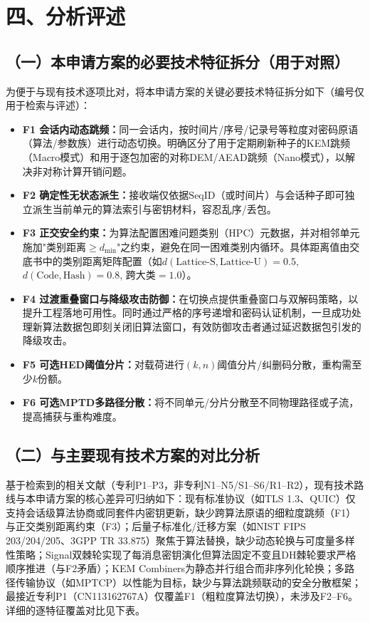 \documentclass[12pt,a4paper]{article}
\begin{document}
\vspace{0.5em}

\section*{四、分析评述}

\subsection*{（一）本申请方案的必要技术特征拆分（用于对照）}

为便于与现有技术逐项比对，将本申请方案的关键必要技术特征拆分如下（编号仅用于检索与评述）：

\begin{itemize}[leftmargin=2em]
    \item \textbf{F1 会话内动态跳频：}同一会话内，按时间片/序号/记录号等粒度对密码原语（算法/参数族）进行动态切换。明确区分了用于定期刷新种子的KEM跳频（Macro模式）和用于逐包加密的对称DEM/AEAD跳频（Nano模式），以解决非对称计算开销问题。
    \item \textbf{F2 确定性无状态派生：}接收端仅依据$\text{SeqID}$（或时间片）与会话种子即可独立派生当前单元的算法索引与密钥材料，容忍乱序/丢包。
    \item \textbf{F3 正交安全约束：}为算法配置困难问题类别（HPC）元数据，并对相邻单元施加"类别距离$\ge d_{\min}$"之约束，避免在同一困难类别内循环。具体距离值由交底书中的类别距离矩阵配置（如$d(\text{Lattice-S}, \text{Lattice-U})=0.5$, $d(\text{Code}, \text{Hash})=0.8$, 跨大类$=1.0$）。
    \item \textbf{F4 过渡重叠窗口与降级攻击防御：}在切换点提供重叠窗口与双解码策略，以提升工程落地可用性。同时通过严格的序号递增和密码认证机制，一旦成功处理新算法数据包即刻关闭旧算法窗口，有效防御攻击者通过延迟数据包引发的降级攻击。
    \item \textbf{F5 可选HED阈值分片：}对载荷进行$(k,n)$阈值分片/纠删码分散，重构需至少$k$份额。
    \item \textbf{F6 可选MPTD多路径分散：}将不同单元/分片分散至不同物理路径或子流，提高捕获与重构难度。
\end{itemize}

\subsection*{（二）与主要现有技术方案的对比分析}

基于检索到的相关文献（专利P1--P3，非专利N1--N5/S1--S6/R1--R2），现有技术路线与本申请方案的核心差异可归纳如下：现有标准协议（如TLS 1.3、QUIC）仅支持会话级算法协商或同套件内密钥更新，缺少跨算法原语的细粒度跳频（F1）与正交类别距离约束（F3）；后量子标准化/迁移方案（如NIST FIPS 203/204/205、3GPP TR 33.875）聚焦于算法替换，缺少动态轮换与可度量多样性策略；Signal双棘轮实现了每消息密钥演化但算法固定不变且DH棘轮要求严格顺序推进（与F2矛盾）；KEM Combiners为静态并行组合而非序列化轮换；多路径传输协议（如MPTCP）以性能为目标，缺少与算法跳频联动的安全分散框架；最接近专利P1（CN113162767A）仅覆盖F1（粗粒度算法切换），未涉及F2--F6。详细的逐特征覆盖对比见下表。
\end{document}
